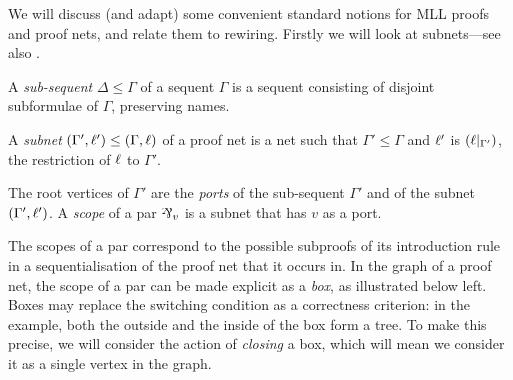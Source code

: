 \documentclass[conference]{IEEEtran}
\let\aftersubsection=\noindent
\let\capsabbrev=\uppercase
\begin{document}
\aftersubsection
We will discuss (and adapt) some convenient standard notions for \capsabbrev{mll} proofs and proof nets, and relate them to rewiring.
%
Firstly we will look at subnets---see also \cite{Bellin-vandeWiele-1995}.


\begin{definition}
A \emph{sub-sequent} $\Delta\leq\Gamma$ of a sequent $\Gamma$ is a sequent consisting of disjoint subformulae of $\Gamma$, preserving names.
\end{definition}

\begin{definition}
A \emph{subnet} $(\Gamma',\ell') \leq (\Gamma,\ell)$ of a proof net is a net such that $\Gamma'\leq\Gamma$ and $\ell'$ is $(\ell|_{\Gamma'})$, the restriction of $\ell$ to $\Gamma'$.
\end{definition}


The root vertices of $\Gamma'$ are the \emph{ports} of the sub-sequent $\Gamma'$ and of the subnet $(\Gamma',\ell')$.
%
A \emph{scope} of a par $\named v\parr$ is a subnet that has $v$ as a port.


The scopes of a par correspond to the possible subproofs of its introduction rule in a sequentialisation of the proof net that it occurs in.
%
\color{red}
In the graph of a proof net, the scope of a par can be made explicit as a \emph{box}, as illustrated below left.
%
Boxes may replace the switching condition as a correctness criterion: in the example, both the outside and the inside of the box form a tree.
%
To make this precise, we will consider the action of \emph{closing} a box, which will mean we consider it as a single vertex in the graph.
\end{document}
